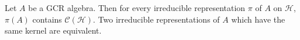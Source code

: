 Let $A$ be a GCR algebra. Then for every irreducible representation $\pi$ of $A$ on $\mathcal{H}$, $\pi(A)$ contains $\mathcal{C}(\mathcal{H})$. Two irreducible representations of $A$ which have the same kernel are equivalent.
